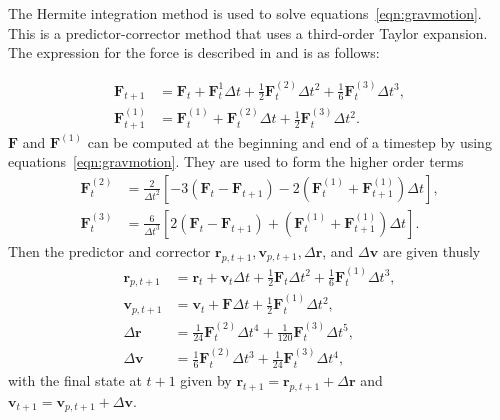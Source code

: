 \documentclass{princeton_astro_thesis}
\numberwithin{equation}{section}
\begin{document}
The Hermite integration method is used to solve equations~\ref{eqn:gravmotion}.  This is a predictor-corrector method that uses a third-order Taylor expansion.  The expression for the force is described in \citet{1999Aarseth} and is as follows:

\begin{subequations}
\begin{align}
    \mathbf{F}_{t+1} &= \mathbf{F}_{t} + \mathbf{F}^{1}_{t}\Delta t + \frac{1}{2}\mathbf{F}^{(2)}_{t}\Delta t^2 + \frac{1}{6}\mathbf{F}^{(3)}_{t}\Delta t^3, \\
    \mathbf{F}^{(1)}_{t+1} &= \mathbf{F}^{(1)}_{t} + \mathbf{F}^{(2)}_{t}\Delta t + \frac{1}{2}\mathbf{F}^{(3)}_{t} \Delta t^2.
\end{align}
\label{eqn:LowOrderHermite}
\end{subequations}
$\mathbf{F}$ and $\mathbf{F}^{(1)}$ can be computed at the beginning and end of a timestep by using equations~\ref{eqn:gravmotion}. They are used to form the higher order terms
\begin{subequations}
\begin{align}
    \mathbf{F}^{(2)}_{t} &= \frac{2}{\Delta t^2}\left[-3(\mathbf{F}_{t} -\mathbf{F}_{t+1}) - 2(\mathbf{F}^{(1)}_{t} + \mathbf{F}^{(1)}_{t+1}) \Delta t\right], \\
    \mathbf{F}^{(3)}_{t} &= \frac{6}{\Delta t^3}\left[2(\mathbf{F}_{t} - \mathbf{F}_{t+1}) + (\mathbf{F}^{(1)}_{t} + \mathbf{F}^{(1)}_{t+1})\Delta t\right].
\end{align}
\label{eqn:HigherOrderHermite}
\end{subequations}
Then the predictor and corrector $\mathbf{r}_{p, t+1}, \mathbf{v}_{p, t+1}, \Delta \mathbf{r}$, and $\Delta \mathbf{v}$ are given thusly
\begin{subequations}
\begin{align}
    \mathbf{r}_{p, t+1} &= \mathbf{r}_{t} + \mathbf{v}_{t} \Delta t + \frac{1}{2} \mathbf{F}_{t} \Delta t^2 + \frac{1}{6} \mathbf{F}^{(1)}_{t} \Delta t^3, \\
    \mathbf{v}_{p, t+1} &= \mathbf{v}_{t} + \mathbf{F} \Delta t + \frac{1}{2}\mathbf{F}^{(1)}_{t} \Delta t^2, \\
    \Delta \mathbf{r} &= \frac{1}{24} \mathbf{F}^{(2)}_{t} \Delta t^4 + \frac{1}{120}\mathbf{F}^{(3)}_{t} \Delta t^5, \\
    \Delta \mathbf{v} &= \frac{1}{6} \mathbf{F}^{(2)}_{t} \Delta t^3 + \frac{1}{24}\mathbf{F}^{(3)}_{t} \Delta t^4,
    \end{align}
\label{eqn:PredCorr}
\end{subequations}
with the final state at $t+1$ given by $\mathbf{r}_{t+1} = \mathbf{r}_{p, t+1} + \Delta \mathbf{r}$ and $ \mathbf{v}_{t+1} = \mathbf{v}_{p, t+1} + \Delta \mathbf{v}$. 
\end{document}
